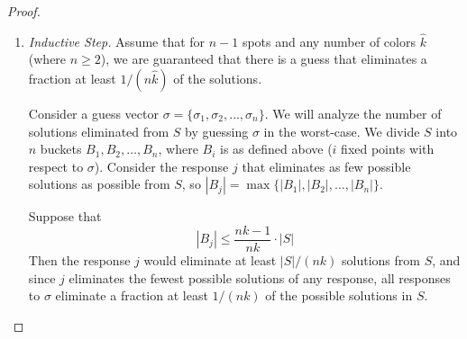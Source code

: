 \documentclass[12pt, a4paper]{article}
\begin{document}
\begin{enumerate}
\begin{proof}
\begin{enumerate}[label=]
			\item\textit{Inductive Step.} Assume that for $n-1$ spots and any number
			of colors $\widehat{k}$ (where $n\ge 2$), we are guaranteed that
			there is a guess that eliminates a fraction at least $1/(n\widehat{k})$
			of the solutions.
			
			Consider a guess vector $\sigma=\{\sigma_1, \sigma_2, \ldots, \sigma_n\}$.
			We will analyze the number of solutions
			eliminated from $S$ by guessing $\sigma$ in the worst-case. We divide $S$
			into $n$ buckets $B_1, B_2, \ldots, B_n$, where $B_i$ is as defined above
			($i$ fixed points with respect to $\sigma$). Consider the response $j$
			that eliminates as few possible solutions as possible from $S$,
			so $|B_j| = \max\{|B_1|, |B_2|, \ldots, |B_n|\}$.
			
			Suppose that
				\begin{equation*}
				|B_j|\le\frac{nk - 1}{nk}\cdot|S|
				\end{equation*}
			Then the response $j$ would eliminate at least $|S|/(nk)$ solutions from
			$S$, and since $j$ eliminates the fewest possible solutions of any
			response, all responses to $\sigma$ eliminate a fraction at least
			$1/(nk)$ of the possible solutions in $S$.
			

\end{enumerate}
\end{proof}
\end{enumerate}
\end{document}
